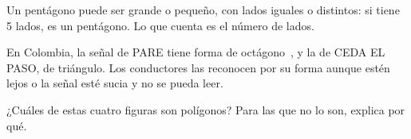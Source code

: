 \documentclass[11pt]{article}
\begin{document}
\begin{ejemplo}
Un pentágono puede ser grande o pequeño, con lados iguales o distintos: si
tiene 5 lados, es un pentágono. Lo que cuenta es el número de lados.
\end{ejemplo}

\begin{aplicacion}
En Colombia, la señal de PARE tiene forma de octágono~\cite{mintransporte},
y la de CEDA EL PASO, de triángulo. Los conductores las reconocen por su
forma aunque estén lejos o la señal esté sucia y no se pueda leer.
\end{aplicacion}

\begin{preguntas}
\pregunta ¿Cuáles de estas cuatro figuras son polígonos? Para las que no lo
son, explica por qué.
\begin{center}
\end{center}


\end{preguntas}
\end{document}
